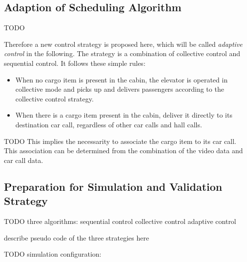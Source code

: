 \subsection{Adaption of Scheduling Algorithm}




TODO

Therefore a new control strategy is proposed here, which will be called \emph{adaptive control} in the following. 
The strategy is a combination of collective control and sequential control.
It follows these simple rules:

\begin{itemize}
    \item When no cargo item is present in the cabin, the elevator is operated in collective mode and picks up and delivers passengers according to the collective control strategy.
    \item When there is a cargo item present in the cabin, deliver it directly to its destination car call, regardless of other car calls and hall calls.
\end{itemize}

TODO
This implies the necessarity to associate the cargo item to its car call. 
This association can be determined from the combination of the video data and car call data.

\subsection{Preparation for Simulation and Validation Strategy}

TODO
three algorithms:
sequential control
collective control
adaptive control

describe pseudo code of the three strategies here

TODO simulation configuration:
\autocite[][p.~347]{barney2016handbook}



